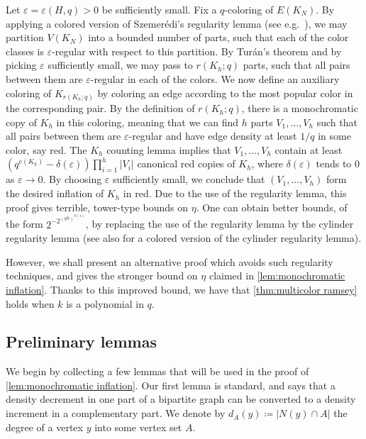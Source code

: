 \documentclass[11pt]{article}
\numberwithin{equation}{section}
\theoremstyle{plain}
\theoremstyle{remark}
\newcommand\ab[1]{\lvert #1 \rvert}
\begin{document}
Let $\varepsilon = \varepsilon(H,q)>0$ be sufficiently small. Fix a $q$-coloring of $E(K_N)$. By applying a colored version of Szemer\'edi's regularity lemma (see e.g.\ \cite[Theorem 1.18]{MR1395865}), we may partition $V(K_N)$ into a bounded number of parts, such that each of the color classes is $\varepsilon$-regular with respect to this partition. By Tur\'an's theorem and by picking $\varepsilon$ sufficiently small, we may pass to $r(K_h;q)$ parts, such that all pairs between them are $\varepsilon$-regular in each of the colors. We now define an auxiliary coloring of $K_{r(K_h;q)}$ by coloring an edge according to the most popular color in the corresponding pair. By the definition of $r(K_h;q)$, there is a monochromatic copy of $K_h$ in this coloring, meaning that we can find $h$ parts $V_1,\dots,V_h$ such that all pairs between them are $\varepsilon$-regular and have edge density at least $1/q$ in some color, say red. The $K_h$ counting lemma implies that $V_1,\dots,V_h$ contain at least $(q^{e(K_h)}-\delta(\varepsilon))\prod_{i=1}^h \ab{V_i}$ canonical red copies of $K_h$, where $\delta(\varepsilon)$ tends to $0$ as $\varepsilon \to 0$. By choosing $\varepsilon$ sufficiently small, we conclude that $(V_1,\dots,V_h)$ form the desired inflation of $K_h$ in red. Due to the use of the regularity lemma, this proof gives terrible, tower-type bounds on $\eta$. One can obtain better bounds, of the form $2^{-2^{(qh)^{O(1)}}}$, by replacing the use of the regularity lemma by the cylinder regularity lemma \cite{MR1333857} (see also \cite{MR4170446} for a colored version of the cylinder regularity lemma).


However, we shall present an alternative proof which avoids such regularity techniques, and gives the stronger bound on $\eta$ claimed in \cref{lem:monochromatic inflation}. Thanks to this improved bound, we have that \cref{thm:multicolor ramsey} holds when $k$ is a polynomial in $q$.


\subsection{Preliminary lemmas}
We begin by collecting a few lemmas that will be used in the proof of \cref{lem:monochromatic inflation}.
 Our first lemma is standard, and says that a density decrement in one part of a bipartite graph can be converted to a density increment in a complementary part.
 We denote by $d_{A}(y) \coloneqq \ab{N(y) \cap A}$ the degree of a vertex $y$ into some vertex set $A$.
\end{document}
